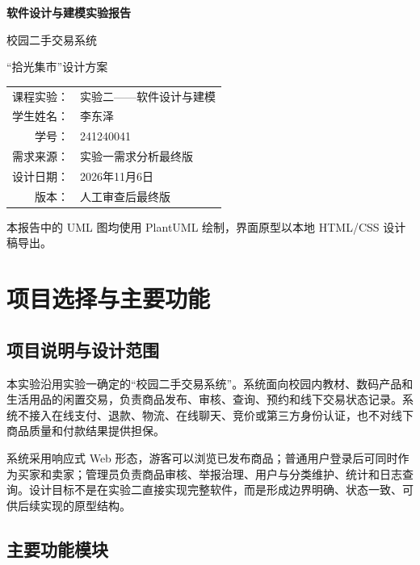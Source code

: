 \documentclass[12pt,a4paper]{ctexart}
\renewcommand{\arraystretch}{1.35}
\begin{document}
\begin{titlepage}
\centering
\vspace*{2.5cm}
{\Huge\bfseries 软件设计与建模实验报告\par}
\vspace{1.2cm}
{\LARGE 校园二手交易系统\par}
\vspace{0.6cm}
{\large “拾光集市”设计方案\par}
\vspace{2.3cm}
\renewcommand{\arraystretch}{1.7}
\begin{tabular}{rl}
课程实验：&实验二——软件设计与建模\\
学生姓名：&李东泽\\
学号：&241240041\\
需求来源：&实验一需求分析最终版\\
设计日期：&2026年11月6日\\
版本：&人工审查后最终版\\
\end{tabular}
\vfill
{\color{muted}本报告中的 UML 图均使用 PlantUML 绘制，界面原型以本地 HTML/CSS 设计稿导出。}
\end{titlepage}

\begingroup
\small
\tableofcontents
\endgroup
\clearpage

\section{项目选择与主要功能}

\subsection{项目说明与设计范围}

本实验沿用实验一确定的“校园二手交易系统”。系统面向校园内教材、数码产品和生活用品的闲置交易，负责商品发布、审核、查询、预约和线下交易状态记录。系统不接入在线支付、退款、物流、在线聊天、竞价或第三方身份认证，也不对线下商品质量和付款结果提供担保。

系统采用响应式 Web 形态，游客可以浏览已发布商品；普通用户登录后可同时作为买家和卖家；管理员负责商品审核、举报治理、用户与分类维护、统计和日志查询。设计目标不是在实验二直接实现完整软件，而是形成边界明确、状态一致、可供后续实现的原型结构。

\subsection{主要功能模块}
\end{document}
